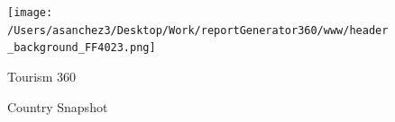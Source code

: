 \documentclass{article}\usepackage[]{graphicx}\usepackage[]{color}
\begin{document}
%



\begin{figure}
  \vspace{-3ex} %
\end{figure}

\begin{figure}
  \vspace{-1ex} %
  \texttt{[image: /Users/asanchez3/Desktop/Work/reportGenerator360/www/header\_background\_FF4023.png]}
\end{figure}

\begin{figure}
\begin{minipage}[t]{0.99\textwidth} %
  \vspace*{-26.8cm}
  \begin{minipage}[t]{0.48\textwidth} %
    \vspace{-1ex}
    \begin{minipage}[t]{0.99\textwidth} %
      \hspace{5ex}\raggedright\Large{\color{white}Tourism 360}
    \end{minipage}
  
    \begin{minipage}[b]{0.99\textwidth} 
      \vspace{4ex}
    \end{minipage}
    
    \begin{minipage}[t]{0.99\textwidth} %
      \vspace{4ex}
      \hspace{5ex}\raggedright\large{\color{white}Country Snapshot}
    \end{minipage}  
  \end{minipage}
  \begin{minipage}[t]{0.56\textwidth} %
    \vspace{-4ex}
    \begin{minipage}[c]{0.30\textwidth}



\end{minipage}
\end{minipage}
\end{minipage}
\end{figure}
\end{document}
